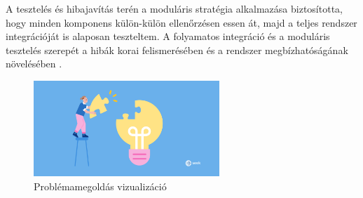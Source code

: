 A tesztelés és hibajavítás terén a moduláris stratégia alkalmazása biztosította, 
hogy minden komponens külön-külön ellenőrzésen essen át, majd a teljes rendszer integrációját is alaposan teszteltem. 
A folyamatos integráció és a moduláris tesztelés szerepét 
a hibák korai felismerésében és a rendszer megbízhatóságának növelésében \cite{Szalay2018,Kaposi2019}. 

\begin{figure}[H]
    \centering
    \includegraphics[width=70mm, keepaspectratio]{figures/problem.jpg}
    \caption{Problémamegoldás vizualizáció}
    \label{fig:problem_solving}
\end{figure}


